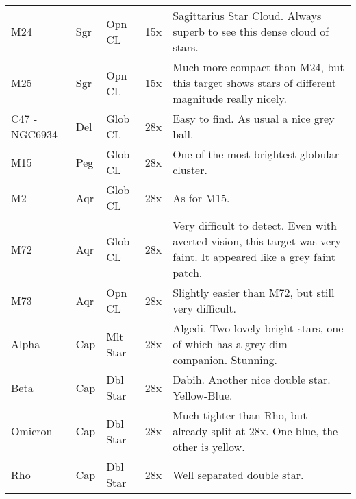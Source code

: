 \begin{longtable}{ p{0.7in}  p{0.3in}  p{0.6in}  p{0.9in}  p{5.8in} }
M24 & Sgr & Opn CL & 15x & Sagittarius Star Cloud. Always superb to see this dense cloud of stars.  \\ 
M25 & Sgr & Opn CL & 15x & Much more compact than M24, but this target shows stars of different magnitude really nicely. \\ 
C47 - NGC6934 & Del & Glob CL & 28x & Easy to find. As usual a nice grey ball. \\ 
M15 & Peg & Glob CL & 28x & One of the most brightest globular cluster.  \\ 
M2 & Aqr & Glob CL & 28x & As for M15. \\ 
M72 & Aqr & Glob CL & 28x & Very difficult to detect. Even with averted vision, this target was very faint. It appeared like a grey faint patch. \\ 
M73 & Aqr & Opn CL & 28x & Slightly easier than M72, but still very difficult. \\ 
Alpha & Cap & Mlt Star & 28x & Algedi. Two lovely bright stars, one of which has a grey dim companion. Stunning. \\ 
Beta & Cap & Dbl Star & 28x & Dabih. Another nice double star. Yellow-Blue. \\ 
Omicron & Cap & Dbl Star & 28x & Much tighter than Rho, but already split at 28x. One blue, the other is yellow. \\ 
Rho & Cap & Dbl Star & 28x & Well separated double star. \\ 
\hline 
\end{longtable} 
